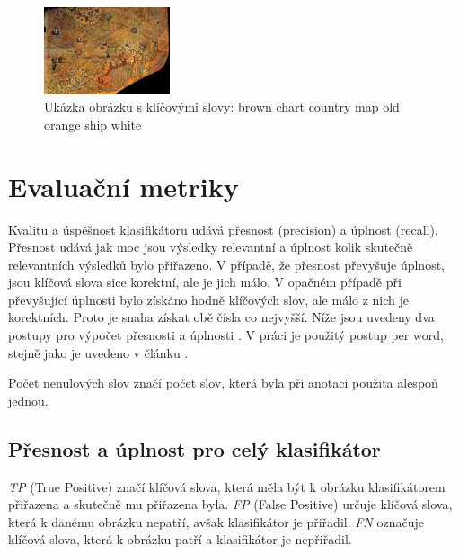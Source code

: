 \documentclass[czech,BP]{thesiskiv}
\begin{document}
\begin{figure}[h]
		\centering
		\includegraphics[width=140px]{./img/esp.jpg}	
		\caption{Ukázka obrázku s klíčovými slovy: brown chart country map old orange ship white}
\end{figure}



\chapter{Evaluační metriky}
\par Kvalitu a úspěšnost klasifikátoru udává přesnost (precision) a úplnost (recall). Přesnost udává jak moc jsou výsledky relevantní a úplnost kolik skutečně relevantních výsledků bylo přiřazeno. V případě, že přesnost převyšuje úplnost, jsou klíčová slova sice korektní, ale je jich málo. V opačném případě při převyšující úplnosti bylo získáno hodně klíčových slov, ale málo z nich je korektních. Proto je snaha získat obě čísla co nejvyšší. Níže jsou uvedeny dva postupy pro výpočet přesnosti a úplnosti \cite{Result_A_A}.  V práci je použitý postup per word, stejně jako je uvedeno v článku \citep{JEC}. 
\par Počet nenulových slov značí počet slov, která byla při anotaci použita alespoň jednou. 

\section{Přesnost a úplnost pro celý klasifikátor}
\par \textit{TP} (True Positive) značí klíčová slova, která měla být k obrázku klasifikátorem přiřazena a skutečně mu přiřazena byla. \textit{FP} (False Positive) určuje klíčová slova, která k danému obrázku nepatří, avšak klasifikátor je přiřadil. \textit{FN} označuje klíčová slova, která k obrázku patří a klasifikátor je nepřiřadil. 
\end{document}

